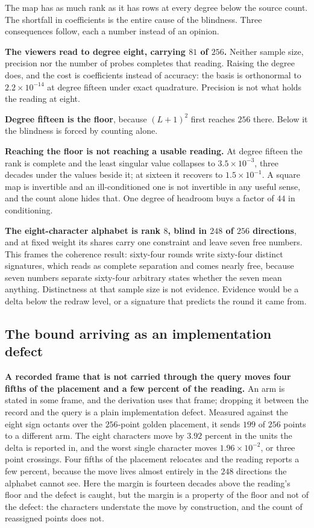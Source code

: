 The map has as much rank as it has rows at every degree below the source count. The shortfall in coefficients is the entire cause of the blindness. Three consequences follow, each a number instead of an opinion.

\textbf{The viewers read to degree eight, carrying \(81\) of \(256\).} Neither sample size, precision nor the number of probes completes that reading. Raising the degree does, and the cost is coefficients instead of accuracy: the basis is orthonormal to \(2.2 \times 10^{-14}\) at degree fifteen under exact quadrature. Precision is not what holds the reading at eight.

\textbf{Degree fifteen is the floor}, because \((L+1)^2\) first reaches \(256\) there. Below it the blindness is forced by counting alone.

\textbf{Reaching the floor is not reaching a usable reading.} At degree fifteen the rank is complete and the least singular value collapses to \(3.5 \times 10^{-3}\), three decades under the values beside it; at sixteen it recovers to \(1.5 \times 10^{-1}\). A square map is invertible and an ill-conditioned one is not invertible in any useful sense, and the count alone hides that. One degree of headroom buys a factor of \(44\) in conditioning.

\textbf{The eight-character alphabet is rank \(8\), blind in \(248\) of \(256\) directions}, and at fixed weight its shares carry one constraint and leave seven free numbers. This frames the coherence result: sixty-four rounds write sixty-four distinct signatures, which reads as complete separation and comes nearly free, because seven numbers separate sixty-four arbitrary states whether the seven mean anything. Distinctness at that sample size is not evidence. Evidence would be a delta below the redraw level, or a signature that predicts the round it came from.

\subsection{The bound arriving as an implementation defect}

\textbf{A recorded frame that is not carried through the query moves four fifths of the placement and a few percent of the reading.} An arm is stated in some frame, and the derivation uses that frame; dropping it between the record and the query is a plain implementation defect. Measured against the eight sign octants over the \(256\)-point golden placement, it sends \(199\) of \(256\) points to a different arm. The eight characters move by \(3.92\) percent in the units the delta is reported in, and the worst single character moves \(1.96 \times 10^{-2}\), or three point crossings. Four fifths of the placement relocates and the reading reports a few percent, because the move lives almost entirely in the \(248\) directions the alphabet cannot see. Here the margin is fourteen decades above the reading's floor and the defect is caught, but the margin is a property of the floor and not of the defect: the characters understate the move by construction, and the count of reassigned points does not.

